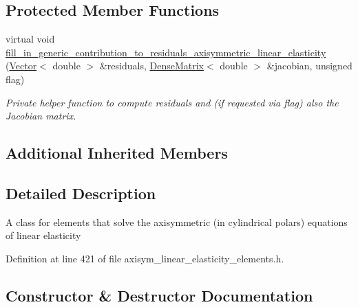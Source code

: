 \subsection*{Protected Member Functions}
\begin{DoxyCompactItemize}
\item 
virtual void \hyperlink{classoomph_1_1AxisymmetricLinearElasticityEquations_a47f493fe9f183efebce35bd708cbb78d}{fill\+\_\+in\+\_\+generic\+\_\+contribution\+\_\+to\+\_\+residuals\+\_\+axisymmetric\+\_\+linear\+\_\+elasticity} (\hyperlink{classoomph_1_1Vector}{Vector}$<$ double $>$ \&residuals, \hyperlink{classoomph_1_1DenseMatrix}{Dense\+Matrix}$<$ double $>$ \&jacobian, unsigned flag)
\begin{DoxyCompactList}\small\item\em Private helper function to compute residuals and (if requested via flag) also the Jacobian matrix. \end{DoxyCompactList}\end{DoxyCompactItemize}
\subsection*{Additional Inherited Members}


\subsection{Detailed Description}
A class for elements that solve the axisymmetric (in cylindrical polars) equations of linear elasticity 

Definition at line 421 of file axisym\+\_\+linear\+\_\+elasticity\+\_\+elements.\+h.



\subsection{Constructor \& Destructor Documentation}
\mbox{\label{classoomph_1_1AxisymmetricLinearElasticityEquations_a858da85e306cdaea7215e05fac652632}} 
